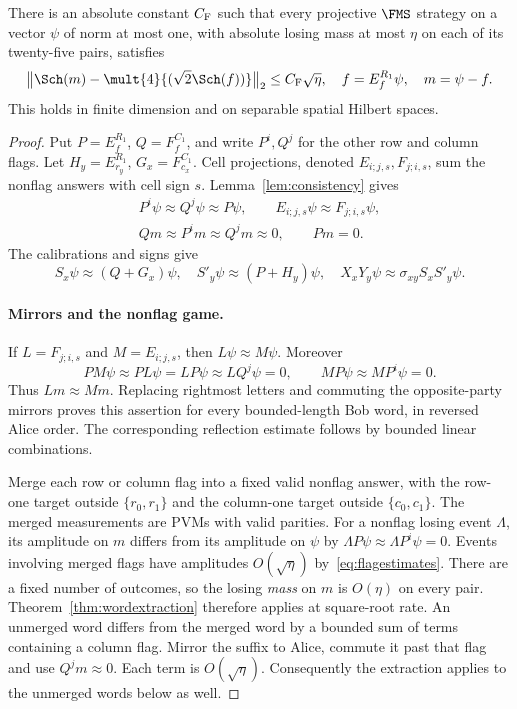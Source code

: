 \begin{theorem}\label{thm:robustsector}
There is an absolute constant $C_{\rm F}$ such that every projective
$\FMS$ strategy on a vector $\psi$ of norm at most one, with absolute
losing mass at most $\eta$ on each of its twenty-five pairs, satisfies
\begin{equation}\label{eq:robustsector}
\bigl\|\Sch(m)-\mult{4}{(\sqrt2\Sch(f))}\bigr\|_2
\leq C_{\rm F}\sqrt\eta,
\quad f=E_f^{R_1}\psi,\quad m=\psi-f.
\end{equation}
This holds in finite dimension and on separable spatial Hilbert spaces.
\end{theorem}
\begin{proof}
Put $P=E_f^{R_1}$, $Q=F_f^{C_1}$, and write $P^i,Q^j$ for the other
row and column flags. Let $H_y=E_{r_y}^{R_1}$, $G_x=F_{c_x}^{C_1}$.
Cell projections, denoted $E_{i;j,s},F_{j;i,s}$, sum the nonflag answers
with cell sign $s$. Lemma~\ref{lem:consistency} gives
\begin{gather}\label{eq:flagestimates}
P^i\psi\approx Q^j\psi\approx P\psi,\qquad
E_{i;j,s}\psi\approx F_{j;i,s}\psi,\nonumber\\
Qm\approx P^im\approx Q^jm\approx0,\qquad Pm=0.
\end{gather}
The calibrations and signs give
\begin{equation}\label{eq:calibrationestimates}
S_x\psi\approx(Q+G_x)\psi,\quad
S'_y\psi\approx(P+H_y)\psi,\quad
X_xY_y\psi\approx\sigma_{xy}S_xS'_y\psi.
\end{equation}

\paragraph{Mirrors and the nonflag game.}
If $L=F_{j;i,s}$ and $M=E_{i;j,s}$, then $L\psi\approx M\psi$.
Moreover
\[
PM\psi\approx PL\psi=LP\psi\approx LQ^j\psi=0,
\qquad MP\psi\approx MP^i\psi=0.
\]
Thus $Lm\approx Mm$. Replacing rightmost letters and commuting the
opposite-party mirrors proves this assertion for every bounded-length
Bob word, in reversed Alice order. The corresponding reflection estimate
follows by bounded linear combinations.

Merge each row or column flag into a fixed valid nonflag answer, with
the row-one target outside $\{r_0,r_1\}$ and the column-one target outside
$\{c_0,c_1\}$. The merged measurements are PVMs with valid parities.
For a nonflag losing event $\Lambda$, its amplitude on $m$ differs from
its amplitude on $\psi$ by $\Lambda P\psi\approx\Lambda P^i\psi=0$.
Events involving merged flags have amplitudes $O(\sqrt\eta)$
by~\eqref{eq:flagestimates}. There are a fixed number of outcomes, so
the losing \emph{mass} on $m$ is $O(\eta)$ on every pair.
Theorem~\ref{thm:wordextraction} therefore applies at square-root rate.
An unmerged word differs from the merged word by a bounded sum of terms
containing a column flag. Mirror the suffix to Alice, commute it past
that flag and use $Q^jm\approx0$. Each term is $O(\sqrt\eta)$.
Consequently the extraction applies to the unmerged words below as well.


\end{proof}
